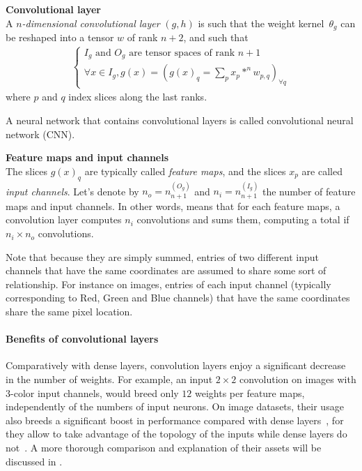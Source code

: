 \begin{definition}\textbf{Convolutional layer}\\
A \emph{$n$-dimensional convolutional layer} $(g,h)$ is such that the weight kernel~$\theta_g$ can be reshaped into a tensor $w$ of rank $n+2$, and such that
\begin{gather*}
\left\{
\begin{array}{l}
  I_g \mbox{ and } O_g \mbox{ are tensor spaces of rank }n+1 \\
  \forall x \in I_g, g(x) = (g(x)_q = \sum\limits_p{x_p \ast^n w_{p,q}})_{\forall q}
\end{array}
\right.
\end{gather*}
where $p$ and $q$ index slices along the last ranks.
\label{def:convlayer}
\end{definition}

A neural network that contains convolutional layers is called convolutional neural network (CNN).

\begin{definition}\textbf{Feature maps and input channels}\\
The slices $g(x)_q$ are typically called \textit{feature maps}, and the slices $x_p$ are called \textit{input channels}. Let's denote by $n_o = n_{n+1}^{(O_g)}$ and $n_i =n_{n+1}^{(I_g)}$ the number of feature maps and input channels.
In other words,  means that for each feature maps, a convolution layer computes $n_i$ convolutions and sums them, computing a total if $n_i \times n_o$ convolutions.
\end{definition}

\begin{remark}
Note that because they are simply summed, entries of two different input channels that have the same coordinates are assumed to share some sort of relationship. For instance on images, entries of each input channel (typically corresponding to Red, Green and Blue channels) that have the same coordinates share the same pixel location.
\end{remark}

\paragraph{Benefits of convolutional layers}
Comparatively with dense layers, convolution layers enjoy a significant decrease in the number of weights. For example, an input $2 \times 2$ convolution on images with $3$-color input channels, would breed only $12$ weights per feature maps, independently of the numbers of input neurons. On image datasets, their usage also breeds a significant boost in performance compared with dense layers~\citep{krizhevsky2012imagenet}, for they allow to take advantage of the topology of the inputs while dense layers do not~\citep{lecun1995convolutional}. A more thorough comparison and explanation of their assets will be discussed in .

